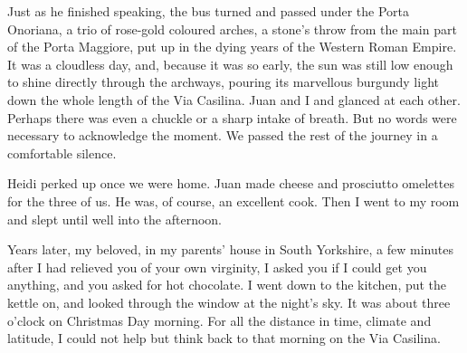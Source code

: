 Just as he finished speaking, the bus turned and passed under the Porta Onoriana, a trio of rose-gold coloured arches, a stone's throw from the main part of the Porta Maggiore, put up in the dying years of the Western Roman Empire. It was a cloudless day, and, because it was so early, the sun was still low enough to shine directly through the archways, pouring its marvellous burgundy light down the whole length of the Via Casilina. Juan and I and glanced at each other. Perhaps there was even a chuckle or a sharp intake of breath. But no words were necessary to acknowledge the moment. We passed the rest of the journey in a comfortable silence.

Heidi perked up once we were home. Juan made cheese and prosciutto omelettes for the three of us. He was, of course, an excellent cook. Then I went to my room and slept until well into the afternoon.

\prosesep

Years later, my beloved, in my parents' house in South Yorkshire, a few minutes after I had relieved you of your own virginity, I asked you if I could get you anything, and you asked for hot chocolate. I went down to the kitchen, put the kettle on, and looked through the window at the night's sky. It was about three o'clock on Christmas Day morning. For all the distance in time, climate and latitude, I could not help but think back to that morning on the Via Casilina.
